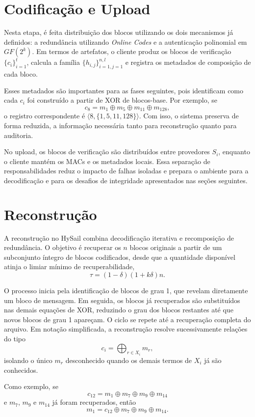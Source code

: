 \section{Codificação e Upload}%
Nesta etapa, é feita distribuição dos blocos utilizando os dois mecanismos já definidos: a redundância utilizando \emph{Online Codes}
e a autenticação polinomial em \(GF(2^k)\). Em termos de artefatos, o cliente produz os blocos de verificação
\(\{c_i\}_{i=1}^{t}\), calcula a família \(\{h_{i,j}\}_{i=1,j=1}^{n,l}\) e registra os metadados de
composição de cada bloco.

Esses metadados são importantes para as fases seguintes, pois identificam como cada \(c_i\) foi construído a
partir de XOR de blocos-base. Por exemplo, se
\[
c_8 = m_1 \oplus m_5 \oplus m_{11} \oplus m_{128},
\]
o registro correspondente é \(\langle 8, \{1,5,11,128\} \rangle\). Com isso, o sistema preserva de forma
reduzida, a informação necessária tanto para reconstrução quanto para auditoria.

No upload, os blocos de verificação são distribuídos entre provedores \(S_i\), enquanto o cliente mantém os
MACs e os metadados locais. Essa separação de responsabilidades reduz o impacto de falhas isoladas e prepara o
ambiente para a decodificação e para os desafios de integridade apresentados nas seções seguintes.

\section{Reconstrução}%

A reconstrução no HySail combina decodificação iterativa e recomposição de redundância. O objetivo é recuperar
os \(n\) blocos originais a partir de um subconjunto íntegro de blocos codificados, desde que a quantidade
disponível atinja o limiar mínimo de recuperabilidade,
\[
\tau = (1-\delta)(1+k\delta)n.
\]

O processo inicia pela identificação de blocos de grau 1, que revelam diretamente um bloco de mensagem.
Em seguida, os blocos já recuperados são substituídos nas demais equações de XOR, reduzindo o grau dos blocos
restantes até que novos blocos de grau 1 apareçam. O ciclo se repete até a recuperação completa do arquivo.
Em notação simplificada, a reconstrução resolve sucessivamente relações do tipo
\[
c_i = \bigoplus_{r \in X_i} m_r,
\]
isolando o único \(m_r\) desconhecido quando os demais termos de \(X_i\) já são conhecidos.

Como exemplo, se
\[
c_{12} = m_1 \oplus m_7 \oplus m_9 \oplus m_{14}
\]
e \(m_7\), \(m_9\) e \(m_{14}\) já foram recuperados, então
\[
m_1 = c_{12} \oplus m_7 \oplus m_9 \oplus m_{14}.
\]

